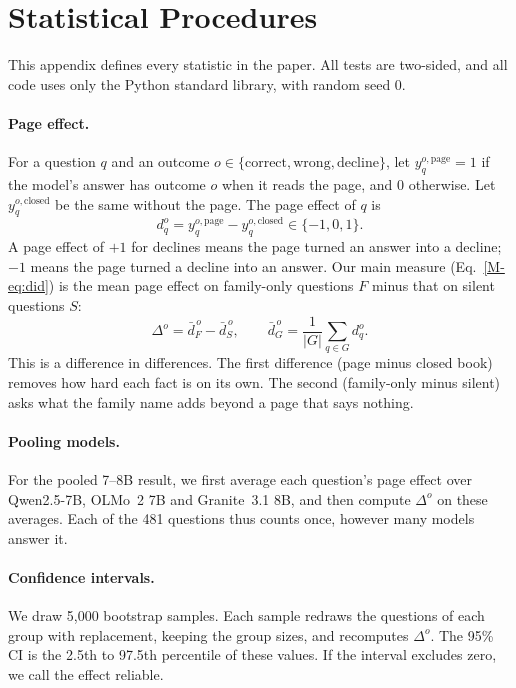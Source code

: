 \section{Statistical Procedures}
\label{app:stats}

This appendix defines every statistic in the paper. All tests are two-sided, and all code uses only the Python standard library, with random seed 0.

\paragraph{Page effect.}
For a question $q$ and an outcome $o\in\{\text{correct},\text{wrong},\text{decline}\}$, let $y_q^{o,\text{page}}=1$ if the model's answer has outcome $o$ when it reads the page, and $0$ otherwise. Let $y_q^{o,\text{closed}}$ be the same without the page. The page effect of $q$ is
\begin{equation}
d_q^{o}=y_q^{o,\text{page}}-y_q^{o,\text{closed}}\in\{-1,0,1\}.
\end{equation}
A page effect of $+1$ for declines means the page turned an answer into a decline; $-1$ means the page turned a decline into an answer. Our main measure (Eq.~\ref{M-eq:did}) is the mean page effect on family-only questions $F$ minus that on silent questions $S$:
\begin{equation}
\Delta^{o}=\bar d^{\,o}_F-\bar d^{\,o}_S,\qquad \bar d^{\,o}_G=\frac{1}{|G|}\sum_{q\in G}d_q^{o}.
\end{equation}
This is a difference in differences. The first difference (page minus closed book) removes how hard each fact is on its own. The second (family-only minus silent) asks what the family name adds beyond a page that says nothing.

\paragraph{Pooling models.}
For the pooled 7--8B result, we first average each question's page effect over Qwen2.5-7B, OLMo~2 7B and Granite~3.1 8B, and then compute $\Delta^o$ on these averages. Each of the 481 questions thus counts once, however many models answer it.

\paragraph{Confidence intervals.}
We draw 5,000 bootstrap samples. Each sample redraws the questions of each group with replacement, keeping the group sizes, and recomputes $\Delta^o$. The 95\% CI is the 2.5th to 97.5th percentile of these values. If the interval excludes zero, we call the effect reliable.

